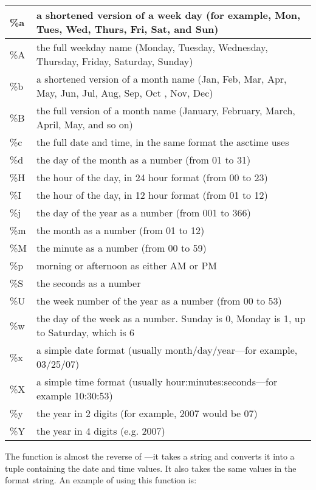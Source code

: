 \begin{center}
\begin{tabular}{|l|p{12cm}|}
\hline
\%a & a shortened version of a week day (for example, Mon, Tues, Wed, Thurs, Fri, Sat, and Sun) \\
\hline
\%A & the full weekday name (Monday, Tuesday, Wednesday, Thursday, Friday, Saturday, Sunday) \\
\hline
\%b & a shortened version of a month name (Jan, Feb, Mar, Apr, May, Jun, Jul, Aug, Sep, Oct , Nov, Dec) \\
\hline
\%B & the full version of a month name (January, February, March, April, May, and so on) \\
\hline
\%c & the full date and time, in the same format the asctime uses \\
\hline
\%d & the day of the month as a number (from 01 to 31) \\
\hline
\%H & the hour of the day, in 24 hour format (from 00 to 23) \\
\hline
\%I & the hour of the day, in 12 hour format (from 01 to 12) \\
\hline
\%j & the day of the year as a number (from 001 to 366) \\
\hline
\%m & the month as a number (from 01 to 12) \\
\hline
\%M & the minute as a number (from 00 to 59) \\
\hline
\%p & morning or afternoon as either AM or PM \\
\hline
\%S & the seconds as a number \\
\hline
\%U & the week number of the year as a number (from 00 to 53) \\
\hline
\%w & the day of the week as a number.  Sunday is 0, Monday is 1, up to Saturday, which is 6 \\
\hline
\%x & a simple date format (usually month/day/year---for example, 03/25/07) \\
\hline
\%X & a simple time format (usually hour:minutes:seconds---for example 10:30:53) \\
\hline
\%y & the year in 2 digits (for example, 2007 would be 07) \\
\hline
\%Y & the year in 4 digits (e.g. 2007) \\
\hline
\end{tabular}
\end{center}

The function  is almost the reverse of ---it takes a string and converts it into a tuple containing the date and time values. It also takes the same values in the format string. An example of using this function is:

